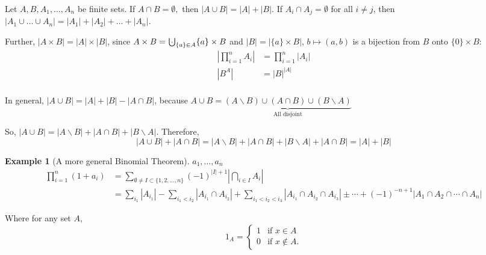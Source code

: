 \documentclass{article}
\newcommand{\bigcupdot}{\mathop{\mathchoice{\hspace{0.45em}}{\hspace{0.35em}}{}{}\cdot\mathchoice{\hspace{-0.85em}}{\hspace{-0.725em}}{}{}\bigcup\limits}}
\theoremstyle{definition}
\newtheorem*{example}{Example}
\begin{document}
Let $A,B,A_1,\dots,A_n$ be finite sets. If $A\cap B = \emptyset,$ then $|A\cup B| = |A| + |B|$. If $A_i\cap A_j = \emptyset$ for all $i\neq j$, then $|A_1\cup\dots\cup A_n| = |A_1| + |A_2| + \dots + |A_n|$.

Further, $|A\times B| = |A|\times|B|$, since $A\times B = \bigcupdot_{\{a\} \in A} \{a\} \times B$ and $|B| = |\{a\} \times B|$, $b \mapsto (a,b)$ is a bijection from $B$ 
onto $\{0\}\times B$:
\begin{align*}
    |\prod_{i=1}^nA_i| &= \prod_{i=1}^n|A_i| \\
    |B^A| &=|B|^{|A|} \\
\end{align*}

In general, $|A \cup B| = |A| + |B| - |A \cap B|$, because $A\cup B =\underbrace{(A\backslash B)\cup(A\cap B)\cup(B\backslash A)}_{\text{All disjoint}}$

So, $|A \cup B| = |A \backslash B| + |A \cap B| + |B \backslash A|$. Therefore, $$|A \cup B| + |A \cap B| = |A \backslash B| + |A \cap B| + |B \backslash A| + |A \cap B| = |A| + |B|$$

\begin{example}[A more general Binomial Theorem]
$a_1,\dots,a_n$
\begin{align*}
   \prod_{i=1}^n(1 + a_i) &=  \sum_{\emptyset\neq I \subset \{1,2,\dots,n\}}(-1)^{|I| + 1}\left|\bigcap_{i\in I}A_i\right| \\ 
   &= \sum_{i_1} |A_{i_1}| - \sum_{i_1 < i_2} |A_{i_1} \cap A_{i_2}| + \sum_{i_1 < i_2 < i_3} |A_{i_1} \cap A_{i_2} \cap A_{i_3}| \pm\cdots + (-1)^{-n+1}|A_1 \cap A_2 \cap \cdots \cap A_n|
\end{align*}

\end{example}
Where for any set $A$,
\[1_A = \begin{cases}
    1 & \text{if } x\in A \\
    0 & \text{if } x\not\in A.
\end{cases}\]
\end{document}

